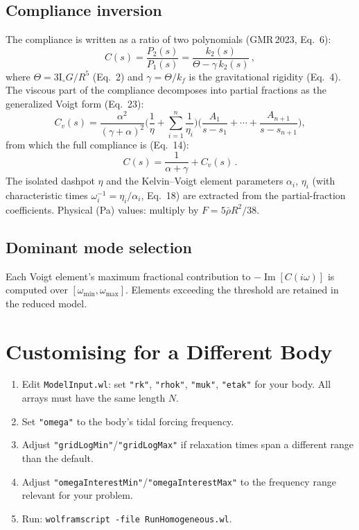 \documentclass[11pt]{article}
\begin{document}
\subsection{Compliance inversion}

The compliance is written as a ratio of two polynomials
(GMR\,2023, Eq.~6):
\begin{equation}
  C(s) = \frac{P_2(s)}{P_1(s)}
    = \frac{k_2(s)}{\Theta - \gamma\,k_2(s)}\,,
\end{equation}
where $\Theta = 3\mathrm{I}_\circ G/R^5$ (Eq.~2) and
$\gamma = \Theta/k_f$ is the gravitational rigidity (Eq.~4).
The viscous part of the compliance decomposes into partial fractions
as the generalized Voigt form (Eq.~23):
\begin{equation}
  C_v(s) = \frac{\alpha^2}{(\gamma+\alpha)^2}
    \biggl(\frac{1}{\eta} + \sum_{i=1}^{n}\frac{1}{\eta_i}\biggr)
    \biggl(\frac{A_1}{s - s_1} + \cdots
    + \frac{A_{n+1}}{s - s_{n+1}}\biggr),
\end{equation}
from which the full compliance is (Eq.~14):
\begin{equation}
  C(s) = \frac{1}{\alpha + \gamma} + C_v(s)\,.
\end{equation}
The isolated dashpot $\eta$ and the Kelvin--Voigt element parameters
$\alpha_i$, $\eta_i$ (with characteristic times
$\omega_i^{-1} = \eta_i/\alpha_i$, Eq.~18)
are extracted from the partial-fraction coefficients.
Physical (Pa) values: multiply by $F = 5\bar\rho R^2/38$.

\subsection{Dominant mode selection}

Each Voigt element's maximum fractional contribution to
$-\operatorname{Im}[C(i\omega)]$ is computed over
$[\omega_{\min}, \omega_{\max}]$.  Elements exceeding the threshold
are retained in the reduced model.

\section{Customising for a Different Body}
\label{sec:custom}

\begin{enumerate}
  \item Edit \texttt{ModelInput.wl}: set \texttt{"rk"},
    \texttt{"rhok"}, \texttt{"muk"}, \texttt{"etak"} for your body.
    All arrays must have the same length $N$.
  \item Set \texttt{"omega"} to the body's tidal forcing frequency.
  \item Adjust \texttt{"gridLogMin"}/\texttt{"gridLogMax"} if
    relaxation times span a different range than the default.
  \item Adjust \texttt{"omegaInterestMin"}/\texttt{"omegaInterestMax"}
    to the frequency range relevant for your problem.
  \item Run: \texttt{wolframscript -file RunHomogeneous.wl}.
\end{enumerate}
\end{document}
